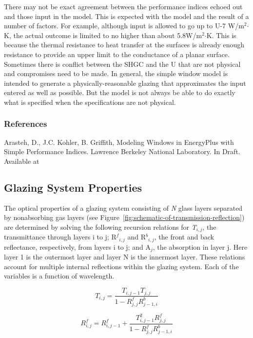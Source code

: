 There may not be exact agreement between the performance indices echoed out and those input in the model. This is expected with the model and the result of a number of factors. For example, although input is allowed to go up to U-7 W/m\(^{2}\)\(\cdot\)K, the actual outcome is limited to no higher than about 5.8W/m\(^{2}\)\(\cdot\)K. This is because the thermal resistance to heat transfer at the surfaces is already enough resistance to provide an upper limit to the conductance of a planar surface. Sometimes there is conflict between the SHGC and the U that are not physical and compromises need to be made. In general, the simple window model is intended to generate a physically-reasonable glazing that approximates the input entered as well as possible. But the model is not always be able to do exactly what is specified when the specifications are not physical.

\subsubsection{References}\label{references-054}

Arasteh, D., J.C. Kohler, B. Griffith, Modeling Windows in EnergyPlus with Simple Performance Indices. Lawrence Berkeley National Laboratory. In Draft. Available at

\subsection{Glazing System Properties}\label{glazing-system-properties}

The optical properties of a glazing system consisting of \emph{N} glass layers separated by nonabsorbing gas layers (see Figure~\ref{fig:schematic-of-transmission-reflection}) are determined by solving the following recursion relations for \emph{T\(_{i,j}\)}, the transmittance through layers i to j; {R\(^{f}\)\(_{i,j}\)} and {R\(^{b}\)\(_{i,j}\)}, the front and back reflectance, respectively, from layers i to j; and A\(_{j}\), the absorption in layer j. Here layer 1 is the outermost layer and layer N is the innermost layer. These relations account for multiple internal reflections within the glazing system. Each of the variables is a function of wavelength.

\begin{equation}
{T_{i,j}} = \frac{{{T_{i,j - 1}}{T_{j,j}}}}{{1 - R_{j,j}^fR_{j - 1,i}^b}}
\label{eq:Tijequation}
\end{equation}

\begin{equation}
R_{i,j}^f = R_{i,j - 1}^f + \frac{{T_{i,j - 1}^2R_{j,j}^f}}{{1 - R_{j,j}^fR_{j - 1,i}^b}}
\end{equation}

